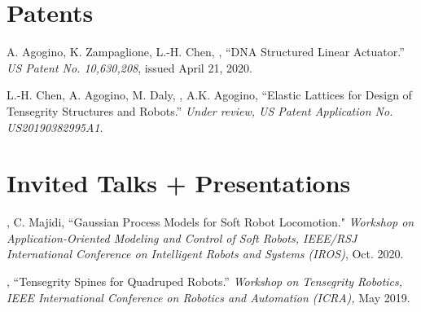\documentclass[letterpaper]{deedy-resume} %
\begin{document}
{%

\section{Patents}

\vspace{0.1cm}

\begin{etaremune}[itemsep=0.1cm]

\item A. Agogino, K. Zampaglione, L.-H. Chen, \underline{{}}, ``DNA Structured Linear Actuator.'' {\it US Patent No. 10,630,208}, issued April 21, 2020.

\item L.-H. Chen, A. Agogino, M. Daly, \underline{{}}, A.K. Agogino, ``Elastic Lattices for Design of Tensegrity Structures and Robots.'' {\it Under review, US Patent Application No. US20190382995A1}.

\end{etaremune}


 \section{Invited Talks + Presentations}

 \vspace{0.1cm}


 \begin{etaremune}[itemsep=0.1cm]

\item \underline{{}}, C. Majidi, ``Gaussian Process Models for Soft Robot Locomotion." {\it Workshop on Application-Oriented Modeling and Control of Soft Robots, IEEE/RSJ International Conference on Intelligent Robots and Systems (IROS)}, Oct. 2020.

\item \underline{{}}, ``Tensegrity Spines for Quadruped Robots.'' {\it Workshop on Tensegrity Robotics, IEEE International Conference on Robotics and Automation (ICRA),} May 2019.


\end{etaremune}}
\end{document}
